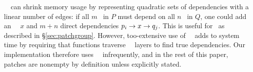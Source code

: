 \Noop\ \patches\ can shrink memory usage by representing quadratic sets of
 dependencies with a linear number of edges: if all $m$ \patches\ in $P$
 must depend on all $n$ \patches\ in $Q$, one could
 add an \noop\ \patch\ $x$ and $m+n$ direct dependencies
 $p_i \rightarrow x \rightarrow q_j$.
%
This is useful for \patchgroups\ as described in \S\ref{sec:patchgroup}.
%
However, too-extensive use of \noop\ \patches\ adds to system time by
 requiring that functions traverse \noop\ \patch\ layers to find true
 dependencies.
%
Our implementation therefore uses \noop\ \patches\ infrequently, and in the
 rest of this paper, patches are nonempty by definition unless explicitly
 stated.


\begin{comment}
To solve this problem, we introduce an additional type of \patch. The
prototypical \patch\ corresponds to some change on disk, but \Kudos\ also
supports \aemphnoop\ \patch\ type, which doesn't change the disk at all.
\Noop\ \patches\ can have \befores, like other \patches, but they don't need to
be written to disk: they are trivially satisfied when all of their \befores\ are
satisfied. Thus, they can be used to ``stand for'' entire sets of other changes.
%
This capability is extremely useful, and is used by most operations on disk
structures so that a single \patch\ can be returned that depends on the whole
change. Likewise, \anoop\ \patch\ can be passed in as a parameter to a disk
operation to make the whole operation depend on a set of other changes. \Noop\
\patches\ allow dependencies between sets with only a linear number of
dependency edges in the \patch\ graph, and without having to pass around arrays
of \patches.
%
The cost is that some functions may have to traverse trees of \noop\ \patches\
to determine true dependencies.
\end{comment}
